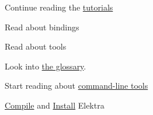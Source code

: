 \begin{DoxyItemize}
\item Continue reading the \hyperlink{md_doc_tutorials_README_doc_tutorials_README_md}{tutorials}
\item Read about bindings
\item Read about tools
\item Look into \hyperlink{md_doc_help_elektra-glossary_doc_help_elektra-glossary_md}{the glossary}.
\item Start reading about \hyperlink{md_doc_help_kdb-introduction_doc_help_kdb-introduction_md}{command-\/line tools}
\item \hyperlink{doc_COMPILE_md}{Compile} and \hyperlink{doc_INSTALL_md}{Install} Elektra 
\end{DoxyItemize}